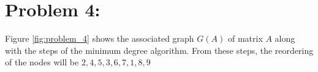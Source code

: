 \newpage
\section*{Problem 4:}

\noindent
Figure \ref{fig:problem_4} shows the associated graph $G(A)$ of matrix $A$ along with the steps of the minimum degree algorithm. From these steps, the reordering of the nodes will be $2, 4, 5, 3, 6, 7, 1, 8, 9$



\begin{figure}[!tbh]
\centering        
    
   

\end{figure}
